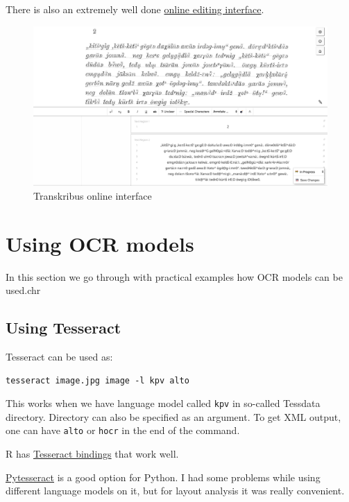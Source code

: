 \documentclass[]{book}
\begin{document}
There is also an extremely well done \href{https://transkribus.eu/r/read/library/}{online editing interface}.

\begin{figure}
\centering
\includegraphics{images/transkribus_interface.jpg}
\caption{Transkribus online interface}
\end{figure}

\hypertarget{using-models}{%
\chapter{Using OCR models}\label{using-models}}

In this section we go through with practical examples how OCR models can be used.chr

\hypertarget{using-tesseract}{%
\section{Using Tesseract}\label{using-tesseract}}

Tesseract can be used as:

\begin{verbatim}
tesseract image.jpg image -l kpv alto
\end{verbatim}

This works when we have language model called \texttt{kpv} in so-called Tessdata directory. Directory can also be specified as an argument. To get XML output, one can have \texttt{alto} or \texttt{hocr} in the end of the command.

R has \href{https://docs.ropensci.org/tesseract/}{Tesseract bindings} that work well.

\href{https://pypi.org/project/pytesseract/}{Pytesseract} is a good option for Python. I had some problems while using different language models on it, but for layout analysis it was really convenient.
\end{document}
